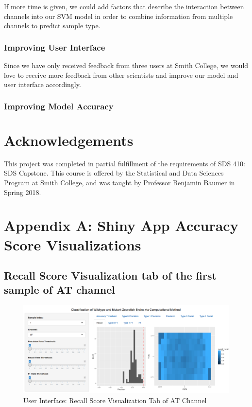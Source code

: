 \documentclass[10pt,letterpaper]{article}
\begin{document}
If more time is given, we could add factors that describe the
interaction between channels into our SVM model in order to combine
information from multiple channels to predict sample type.

\subsubsection{Improving User Interface}\label{improving-user-interface}

Since we have only received feedback from three users at Smith College,
we would love to receive more feedback from other scientists and improve
our model and user interface accordingly.

\subsubsection{Improving Model Accuracy}\label{improving-model-accuracy}

\section{Acknowledgements}\label{acknowledgements}

This project was completed in partial fulfillment of the requirements of
SDS 410: SDS Capstone. This course is offered by the Statistical and
Data Sciences Program at Smith College, and was taught by Professor
Benjamin Baumer in Spring 2018.

\newpage

\section{Appendix A: Shiny App Accuracy Score
Visualizations}\label{appendix-a-shiny-app-accuracy-score-visualizations}

\subsection{Recall Score Visualization tab of the first sample of AT
channel}\label{recall-score-visualization-tab-of-the-first-sample-of-at-channel}

\begin{figure}[h]

{\centering \includegraphics[width=4.91in]{figures/shiny4} 

}

\caption{User Interface: Recall Score Visualization Tab of AT Channel}\label{fig:shiny4}
\end{figure}
\end{document}
